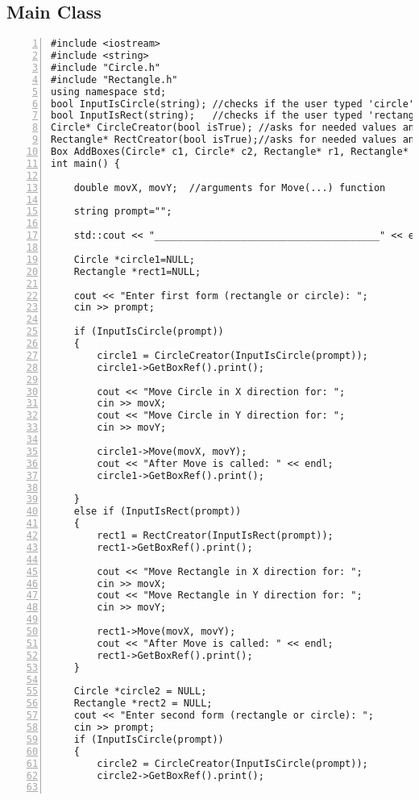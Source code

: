 \documentclass{llncs}
\begin{document}
\subsection{Main Class}
\begin{lstlisting}[basicstyle=\footnotesize\ttfamily, numbers=left, stepnumber=1, numberstyle = \normalsize]
#include <iostream>
#include <string>
#include "Circle.h"
#include "Rectangle.h"
using namespace std; 
bool InputIsCircle(string); //checks if the user typed 'circle', returns bool
bool InputIsRect(string);	//checks if the user typed 'rectangle', returns bool
Circle* CircleCreator(bool isTrue); //asks for needed values and calls circle constructor
Rectangle* RectCreator(bool isTrue);//asks for needed values and calls rectangle constructor
Box AddBoxes(Circle* c1, Circle* c2, Rectangle* r1, Rectangle* r2); 
int main() {

	double movX, movY;	//arguments for Move(...) function
	
	string prompt="";
	
	std::cout << "_______________________________________" << endl; 

	Circle *circle1=NULL;
	Rectangle *rect1=NULL;

	cout << "Enter first form (rectangle or circle): ";
	cin >> prompt;
	
	if (InputIsCircle(prompt))
	{
		circle1 = CircleCreator(InputIsCircle(prompt));
		circle1->GetBoxRef().print();

		cout << "Move Circle in X direction for: ";
		cin >> movX;
		cout << "Move Circle in Y direction for: ";
		cin >> movY;
		
		circle1->Move(movX, movY);
		cout << "After Move is called: " << endl;
		circle1->GetBoxRef().print();

	}
	else if (InputIsRect(prompt))
	{
		rect1 = RectCreator(InputIsRect(prompt));
		rect1->GetBoxRef().print();

		cout << "Move Rectangle in X direction for: ";
		cin >> movX;
		cout << "Move Rectangle in Y direction for: ";
		cin >> movY;
		
		rect1->Move(movX, movY);
		cout << "After Move is called: " << endl;
		rect1->GetBoxRef().print();
	}
	
	Circle *circle2 = NULL;
	Rectangle *rect2 = NULL;
	cout << "Enter second form (rectangle or circle): ";
	cin >> prompt;
	if (InputIsCircle(prompt))
	{
		circle2 = CircleCreator(InputIsCircle(prompt));
		circle2->GetBoxRef().print();


\end{lstlisting}
\end{document}

